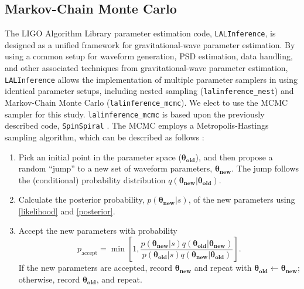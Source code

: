 \documentclass[11pt,a4paper]{emulateapj}
\begin{document}
  
\subsection{Markov-Chain Monte Carlo}
\label{MCMCSection}
  
The LIGO Algorithm Library parameter estimation code, \texttt{LALInference}, is designed as 
a unified framework for gravitational-wave parameter estimation.  By using a common setup for 
waveform generation, PSD estimation, data handling, and other associated techniques from gravitational-wave parameter estimation, \texttt{LALInference} allows the implementation of multiple parameter samplers in using identical parameter setups, including nested sampling (\texttt{lalinference\_nest}) and Markov-Chain Monte Carlo (\texttt{lalinference\_mcmc}).  We elect to use the MCMC sampler for this study.  \texttt{lalinference\_mcmc} is based upon the previously described code, 
\texttt{SpinSpiral} \citep{spinspiral2009, spinspiral2010}.  The MCMC employs a Metropolis-Hastings sampling algorithm, which can be described as follows \citep{Gilks99}:
  
\begin{enumerate}
\item Pick an initial point in the parameter space
  ($\boldsymbol{\theta_{\text{old}}}$), and then propose a random
  ``jump'' to a new set of waveform parameters,
  $\boldsymbol{\theta_{\text{new}}}$.  The jump follows the
  (conditional) probability distribution $q\left(
  \boldsymbol{\theta_{\text{new}}} | \boldsymbol{\theta_{\text{old}}}
  \right)$.
\item Calculate the posterior probability,
  $p(\boldsymbol{\theta_{\text{new}}}|s)$, of the new parameters using
  \eqref{likelihood} and \eqref{posterior}.
\item Accept the new parameters with probability 
  \begin{equation}
    p_\mathrm{accept} = \min \left[ 1, \frac{p(\boldsymbol{\theta_{\text{new}}}|s) q\left(\boldsymbol{\theta_{\text{old}}} | \boldsymbol{\theta_{\text{new}}} \right)}{p(\boldsymbol{\theta_{\text{old}}}|s) q\left(\boldsymbol{\theta_{\text{new}}} | \boldsymbol{\theta_{\text{old}}} \right)} \right].
  \end{equation}
  If the new parameters are accepted, record
  $\boldsymbol{\theta_\text{new}}$ and repeat with
  $\boldsymbol{\theta_\text{old}} \gets
  \boldsymbol{\theta_\text{new}}$; otherwise, record
  $\boldsymbol{\theta_\text{old}}$, and repeat.
\end{enumerate} 
  
\end{document}
